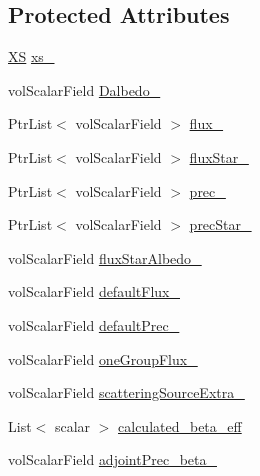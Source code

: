 \subsection*{Protected Attributes}
\begin{DoxyCompactItemize}
\item 
\hyperlink{classFoam_1_1XS}{XS} \hyperlink{classFoam_1_1adjointDiffusionNeutronics_abad5969c1db242c96980bd4c29677f6b}{xs\+\_\+}
\item 
vol\+Scalar\+Field \hyperlink{classFoam_1_1adjointDiffusionNeutronics_a8994f97eb6a9e12f23364432d1393ff9}{Dalbedo\+\_\+}
\item 
Ptr\+List$<$ vol\+Scalar\+Field $>$ \hyperlink{classFoam_1_1adjointDiffusionNeutronics_a43492f1b1f254ce7ca6ec7d88e792c60}{flux\+\_\+}
\item 
Ptr\+List$<$ vol\+Scalar\+Field $>$ \hyperlink{classFoam_1_1adjointDiffusionNeutronics_ab9f02b405697cdeeacf6d3d613a6055f}{flux\+Star\+\_\+}
\item 
Ptr\+List$<$ vol\+Scalar\+Field $>$ \hyperlink{classFoam_1_1adjointDiffusionNeutronics_a736f28d690625a0f42809a45e9b99116}{prec\+\_\+}
\item 
Ptr\+List$<$ vol\+Scalar\+Field $>$ \hyperlink{classFoam_1_1adjointDiffusionNeutronics_a2cb778e2ea68ca016f0215fa178155cf}{prec\+Star\+\_\+}
\item 
vol\+Scalar\+Field \hyperlink{classFoam_1_1adjointDiffusionNeutronics_a146023caaddac32ce560ab5c8a074908}{flux\+Star\+Albedo\+\_\+}
\item 
vol\+Scalar\+Field \hyperlink{classFoam_1_1adjointDiffusionNeutronics_a0e57f3e6c5cec9d5d7824e9e742cf102}{default\+Flux\+\_\+}
\item 
vol\+Scalar\+Field \hyperlink{classFoam_1_1adjointDiffusionNeutronics_ad421eb70060f1b275d7e9814cc52830a}{default\+Prec\+\_\+}
\item 
vol\+Scalar\+Field \hyperlink{classFoam_1_1adjointDiffusionNeutronics_a05a39571155b6ded783dee3b1e8d5faf}{one\+Group\+Flux\+\_\+}
\item 
vol\+Scalar\+Field \hyperlink{classFoam_1_1adjointDiffusionNeutronics_a2467c6f3027ba3b169ccfd2fc9e6efa1}{scattering\+Source\+Extra\+\_\+}
\item 
List$<$ scalar $>$ \hyperlink{classFoam_1_1adjointDiffusionNeutronics_a8411c463c90db7c533e6c9e4df3ecf94}{calculated\+\_\+beta\+\_\+eff}
\item 
vol\+Scalar\+Field \hyperlink{classFoam_1_1adjointDiffusionNeutronics_a3076868be011b89d1792b1d2572ae63a}{adjoint\+Prec\+\_\+beta\+\_\+}
\item 

\end{DoxyCompactItemize}

